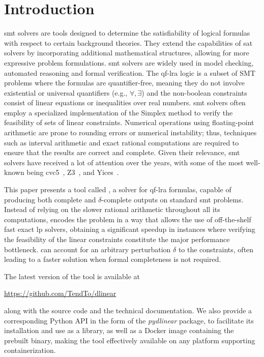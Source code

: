 \documentclass[runningheads]{llncs}
\begin{document}
\section{Introduction}

\gls{smt} solvers are tools designed to determine the satisfiability of logical formulas with respect to certain background theories.
They extend the capabilities of \gls{sat} solvers by incorporating additional mathematical structures, allowing for more expressive problem formulations.
\gls{smt} solvers are widely used in model checking, automated reasoning and formal verification.
The \gls{qf-lra} logic is a subset of SMT problems where the formulas are quantifier-free, meaning they do not involve existential or universal quantifiers (e.g., $\forall, \exists$) and the non-boolean constraints consist of linear equations or inequalities over real numbers.
\gls{smt} solvers often employ a specialized implementation of the Simplex method to verify the feasibility of sets of linear constraints.
Numerical operations using floating-point arithmetic are prone to rounding errors or numerical instability; thus, techniques such as interval arithmetic and exact rational computations are required to ensure that the results are correct and complete.
Given their relevance, \gls{smt} solvers have received a lot of attention over the years, with some of the most well-known being cvc5~\cite{ref:cvc5}, Z3~\cite{ref:z3}, and Yices~\cite{ref:yices}.

This paper presents a tool called \dlinear, a solver for \gls{qf-lra} formulas, capable of producing both complete and $\delta$-complete outputs on standard \gls{smt} problems.
Instead of relying on the slower rational arithmetic throughout all its computations, \dlinear encodes the problem in a way that allows the use of off-the-shelf fast exact \gls{lp} solvers, obtaining a significant speedup in instances where verifying the feasibility of the linear constraints constitute the major performance bottleneck.
\dlinear can account for an arbitrary perturbation $\delta$ to the constraints, often leading to a faster solution when formal completeness is not required.

The latest version of the tool is available at 
\begin{center}
\url{https://github.com/TendTo/dlinear}
\end{center}
along with the source code and the technical documentation.
We also provide a corresponding Python API in the form of the \textit{pydlinear} package, to facilitate its installation and use as a library, as well as a Docker image containing the prebuilt binary, making the tool effectively available on any platform supporting containerization.
\end{document}
